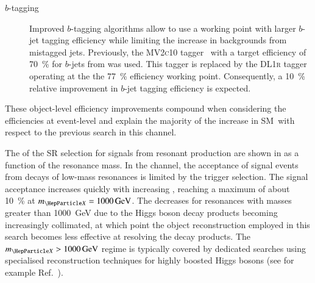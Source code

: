 \begin{description}
\item[$b$-tagging] Improved $b$-tagging algorithms allow to use a working point
  with larger $b$-jet tagging efficiency while limiting the increase in
  backgrounds from mistagged jets. Previously, the \textsc{MV2c10}
  tagger~\cite{ATL-PHYS-PUB-2016-012} with a target efficiency of
  \SI{70}{\percent} for $b$-jets from \ttbar was used. This tagger is replaced
  by the \textsc{DL1r} tagger~\cite{FTAG-2019-07} operating at the the
  \SI{77}{\percent} efficiency working point. Consequently, a \SI{10}{\percent}
  relative improvement in $b$-jet tagging efficiency is expected.


\end{description}
These object-level efficiency improvements compound when considering the
efficiencies at event-level
and explain the majority of the increase in SM~\HH \AccTimesEff with respect to
the previous search in this channel.

The \AccTimesEff of the SR selection for signals from resonant \HH production
are shown in  as a function of the
resonance mass. In the \hadhad channel, the acceptance of signal events from
decays of low-mass resonances is limited by the trigger selection. The signal
acceptance increases quickly with increasing \mX, reaching a maximum of about
\SI{10}{\percent} at $\mX = \SI{1000}{\GeV}$. The \AccTimesEff decreases for
resonances with masses greater than \SI{1000}{\GeV} due to the Higgs boson decay
products becoming increasingly collimated, at which point the object
reconstruction employed in this search becomes less effective at resolving the
decay products. The $\mX > \SI{1000}{\GeV}$ regime is typically covered by
dedicated searches using specialised reconstruction techniques for highly
boosted Higgs bosons (see for example Ref.~\cite{HDBS-2019-22}).

